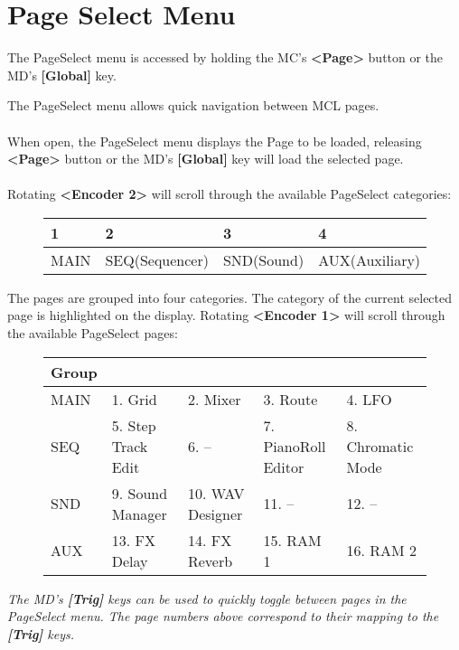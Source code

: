 \chapter{Page Select Menu}
The PageSelect menu is accessed by holding the MC's \textbf{<Page>} button or the MD's \textbf{[Global]} key.

The PageSelect menu allows quick navigation between MCL pages.
\\
\\
When open, the PageSelect menu displays the Page to be loaded, releasing \textbf{<Page>} button or the MD's \textbf{[Global]} key will load the selected page.
\\
\\
Rotating \textbf{<Encoder 2>} will scroll through the available PageSelect categories:

\begin{figure}[h]
    \begin{tabular}{|l|l|l|l|}
    \hline
    \rowcolor[HTML]{C0C0C0} 
    1    & 2              & 3          & 4              \\ \hline
    MAIN & SEQ(Sequencer) & SND(Sound) & AUX(Auxiliary) \\ \hline
    \end{tabular}
\end{figure}

The pages are grouped into four categories. The category of the current selected page is highlighted on the display.
Rotating \textbf{<Encoder 1>} will scroll through the available PageSelect pages:

\begin{figure}[h]
    \begin{tabular}{|l|l|l|l|l|}
    \hline
    \rowcolor[HTML]{C0C0C0} 
    {\color[HTML]{000000} Group} & \multicolumn{4}{l|}{\cellcolor[HTML]{C0C0C0}{\color[HTML]{000000} Pages}}      \\ \hline
    MAIN                              & 1. Grid            & 2. Mixer         & 3. Route           & 4. LFO            \\ \hline
    SEQ                               & 5. Step Track Edit & 6. -- & 7. PianoRoll Editor & 8. Chromatic Mode \\ \hline
    SND                               & 9. Sound Manager   & 10. WAV Designer & 11. --       & 12. --      \\ \hline
    AUX                               & 13. FX Delay       & 14. FX Reverb    & 15. RAM 1          & 16. RAM 2         \\ \hline
    \end{tabular}
\end{figure}

\textit{The MD's \textbf{[Trig]} keys can be used to quickly toggle between pages in the PageSelect menu. The page numbers above correspond to their mapping to the \textbf{[Trig]} keys. }






